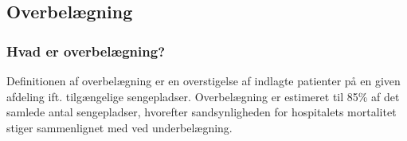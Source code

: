 \subsection{Overbelægning}
\subsubsection{Hvad er overbelægning?}
Definitionen af overbelægning er en overstigelse af indlagte patienter på en given afdeling ift. tilgængelige sengepladser. Overbelægning er estimeret til 85\% af det samlede antal sengepladser, hvorefter sandsynligheden for hospitalets mortalitet  stiger sammenlignet med ved underbelægning. \citep{dodlighed2014}




